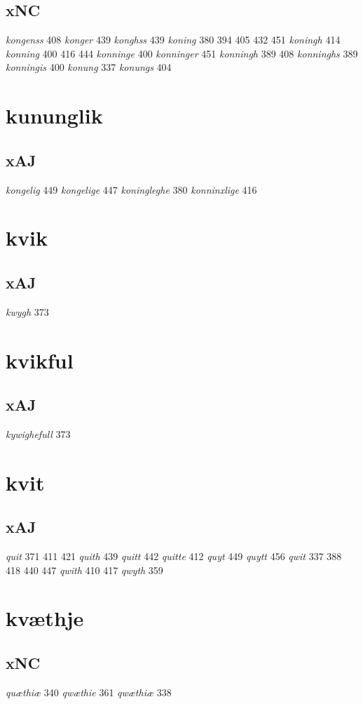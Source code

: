 \documentclass[a4paper,twocolumn]{article}
\begin{document}
\subsection{xNC}
\label{sec:org87c5bef}
\emph{kongenss} 408 \emph{konger} 439 \emph{konghss} 439 \emph{koning} 380 394 405 432 451 \emph{koningh} 414 \emph{konning} 400 416 444 \emph{konninge} 400 \emph{konninger} 451 \emph{konningh} 389 408 \emph{konninghs} 389 \emph{konningis} 400 \emph{konung} 337 \emph{konungs} 404 
\section{kununglik}
\label{sec:org1aaf356}
\subsection{xAJ}
\label{sec:org0e227ae}
\emph{kongelig} 449 \emph{kongelige} 447 \emph{koningleghe} 380 \emph{konninxlige} 416 
\section{kvik}
\label{sec:orgdac3868}
\subsection{xAJ}
\label{sec:org7a3c87b}
\emph{kwygh} 373 
\section{kvikful}
\label{sec:org462b951}
\subsection{xAJ}
\label{sec:orge4728a2}
\emph{kywighefull} 373 
\section{kvit}
\label{sec:org536066a}
\subsection{xAJ}
\label{sec:orgc978387}
\emph{quit} 371 411 421 \emph{quith} 439 \emph{quitt} 442 \emph{quitte} 412 \emph{quyt} 449 \emph{quytt} 456 \emph{qwit} 337 388 418 440 447 \emph{qwith} 410 417 \emph{qwyth} 359 
\section{kvæthje}
\label{sec:orga3553f7}
\subsection{xNC}
\label{sec:orgad20aac}
\emph{quæthiæ} 340 \emph{qwæthie} 361 \emph{qwæthiæ} 338 
\end{document}
